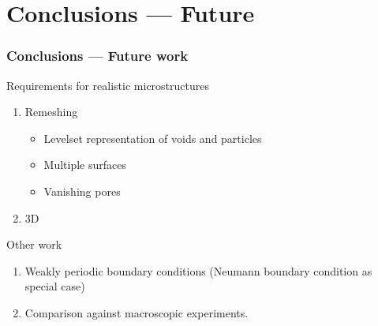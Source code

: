 \documentclass[11pt,mathserif]{beamer}
\begin{document}
\section{Conclusions --- Future}
\begin{frame}
 \frametitle{Conclusions --- Future work}
 Requirements for realistic microstructures
 \begin{enumerate}
  \item Remeshing
  \begin{itemize}
   \item Levelset representation of voids and particles
   \item Multiple surfaces
   \item Vanishing pores
  \end{itemize}
  \item 3D
 \end{enumerate}
 Other work
 \begin{enumerate}
  \item Weakly periodic boundary conditions (Neumann boundary condition as special case)
  \item Comparison against macroscopic experiments.
 \end{enumerate}

\end{frame}

\end{document}
